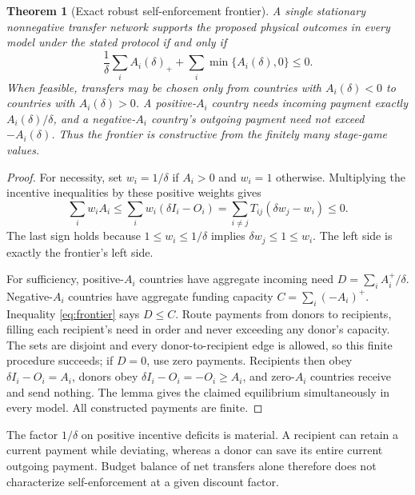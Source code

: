 \documentclass[11pt]{article}
\newtheorem{theorem}{Theorem}
\theoremstyle{definition}
\begin{document}
\begin{theorem}[Exact robust self-enforcement frontier]
A single stationary nonnegative transfer network supports the proposed
physical outcomes in every model under the stated protocol if and only if
\begin{equation}\label{eq:frontier}
 \frac1\delta\sum_i A_i(\delta)_+
       +\sum_i\min\{A_i(\delta),0\}\leq0.
\end{equation}
When feasible, transfers may be chosen only from countries with
$A_i(\delta)<0$ to countries with $A_i(\delta)>0$. A positive-$A_i$
country needs incoming payment exactly $A_i(\delta)/\delta$, and a
negative-$A_i$ country's outgoing payment need not exceed $-A_i(\delta)$.
Thus the frontier is constructive from the finitely many stage-game values.
\end{theorem}
\begin{proof}
For necessity, set $w_i=1/\delta$ if $A_i>0$ and $w_i=1$ otherwise.
Multiplying the incentive inequalities by these positive weights gives
\[
 \sum_i w_iA_i\leq\sum_iw_i(\delta I_i-O_i)
       =\sum_{i\ne j}T_{ij}(\delta w_j-w_i)\leq0.
\]
The last sign holds because $1\leq w_i\leq1/\delta$ implies
$\delta w_j\leq1\leq w_i$. The left side is exactly the frontier's
left side.

For sufficiency, positive-$A_i$ countries have aggregate incoming need
$D=\sum_i A_i^+/\delta$. Negative-$A_i$ countries have aggregate funding
capacity $C=\sum_i(-A_i)^+$. Inequality \eqref{eq:frontier} says $D\leq C$.
Route payments from donors to recipients, filling each recipient's need
in order and never exceeding any donor's capacity. The sets are disjoint
and every donor-to-recipient edge is allowed, so this finite procedure
succeeds; if $D=0$, use zero payments. Recipients then obey
$\delta I_i-O_i=A_i$, donors obey $\delta I_i-O_i=-O_i\geq A_i$, and
zero-$A_i$ countries receive and send nothing. The lemma gives the claimed
equilibrium simultaneously in every model. All constructed payments are
finite.
\end{proof}
The factor $1/\delta$ on positive incentive deficits is material. A recipient
can retain a current payment while deviating, whereas a donor can save its
entire current outgoing payment. Budget balance of net transfers alone
therefore does not characterize self-enforcement at a given discount factor.
\end{document}
